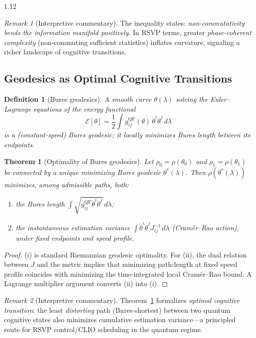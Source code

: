 \documentclass[12pt,a4paper]{article}
\numberwithin{equation}{section}
\newtheorem{definition}{Definition}[section]
\newtheorem{theorem}{Theorem}[section]
\theoremstyle{remark}
\newtheorem{remark}{Remark}[section]
\theoremstyle{definition}
\begin{document}
\begin{spacing}{1.12}
\begin{remark}[Interpretive commentary]
The inequality states: \emph{non-commutativity bends the information manifold positively}. In RSVP terms, greater \emph{phase-coherent complexity} (non-commuting sufficient statistics) inflates curvature, signaling a richer landscape of cognitive transitions.
\end{remark}

\subsection{Geodesics as Optimal Cognitive Transitions}\label{sec:E-geodesics}

\begin{definition}[Bures geodesics]\label{def:E-geodesic}
A smooth curve $\theta(\lambda)$ solving the Euler--Lagrange equations of the energy functional
\[
\mathcal{E}[\theta] = \frac{1}{2}\int g^{\mathrm{QF}}_{ij}(\theta)\,\dot{\theta}^i\dot{\theta}^j\,d\lambda
\]
is a (constant-speed) Bures geodesic; it locally minimizes Bures length between its endpoints.
\end{definition}

\begin{theorem}[Optimality of Bures geodesics]\label{thm:E-optimality}
Let $\rho_0=\rho(\theta_0)$ and $\rho_1=\rho(\theta_1)$ be connected by a unique minimizing Bures geodesic $\theta^\ast(\lambda)$. Then $\rho(\theta^\ast(\lambda))$ minimizes, among admissible paths, both:
\begin{enumerate}[label=(\roman*)]
  \item the Bures length $\int \sqrt{g^{\mathrm{QF}}_{ij}\dot{\theta}^i\dot{\theta}^j}\,d\lambda$;
  \item the \emph{instantaneous estimation variance} $\int \dot{\theta}^i\dot{\theta}^j J_{ij}^{-1}\, d\lambda$ (Cramér--Rao action), under fixed endpoints and speed profile.
\end{enumerate}
\end{theorem}

\begin{proof}
(i) is standard Riemannian geodesic optimality. For (ii), the dual relation between $J$ and the metric implies that minimizing path-length at fixed speed profile coincides with minimizing the time-integrated local Cramér--Rao bound. A Lagrange multiplier argument converts (ii) into (i).
\end{proof}

\begin{remark}[Interpretive commentary]
Theorem~\ref{thm:E-optimality} formalizes \emph{optimal cognitive transition}: the least \emph{distorting} path (Bures-shortest) between two quantum cognitive states also minimizes cumulative estimation variance---a principled route for RSVP control/CLIO scheduling in the quantum regime.
\end{remark}


\end{spacing}
\end{document}

